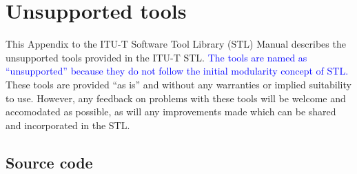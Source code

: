 
\chapter{Unsupported tools}

This Appendix to the ITU-T Software Tool Library (STL) Manual
describes the unsupported tools provided in the ITU-T
STL. \textcolor{blue}{The tools are named as ``unsupported'' because
they do not follow the initial modularity concept of STL.} These
tools are provided ``as is'' and without any warranties or implied
suitability to use. However, any feedback on problems with these tools
will be welcome and accomodated as possible, as will any improvements
made which can be shared and incorporated in the STL.


\section{Source code}

